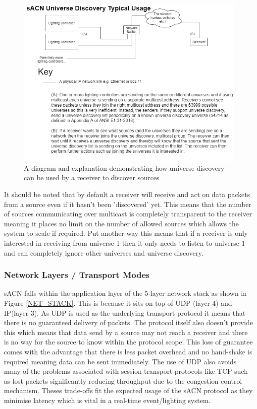 \documentclass[11pt,a4paper]{article}
\begin{document}
\begin{figure}[H]
	\includegraphics[width=\textwidth]{CS4099-Discovery-Explaination}
	\caption{A diagram and explanation demonstrating how universe discovery can be used by a receiver to discover sources}
	\label{UNI_DISCOVERY_DESC}
\end{figure}

It should be noted that by default a receiver will receive and act on data packets from a source even if it hasn't been 'discovered' yet. This means that the number of sources communicating over multicast is completely transparent to the receiver meaning it places no limit on the number of allowed sources which allows the system to scale if required. Put another way this means that if a receiver is only interested in receiving from universe 1 then it only needs to listen to universe 1 and can completely ignore other universes and universe discovery.

\subsubsection{Network Layers / Transport Modes}
sACN falls within the application layer of the 5-layer network stack as shown in Figure \ref{NET_STACK}. This is because it sits on top of UDP (layer 4) and IP(layer 3). As UDP is used as the underlying transport protocol it means that there is no guaranteed delivery of packets. The protocol itself also doesn't provide this which means that data send by a source may not reach a receiver and there is no way for the source to know within the protocol scope. This loss of guarantee comes with the advantage that there is less packet overhead and no hand-shake is required meaning data can be sent immediately. The use of UDP also avoids many of the problems associated with session transport protocols like TCP such as lost packets significantly reducing throughput due to the congestion control mechanism. Theses trade-offs fit the expected usage of the sACN protocol as they minimise latency which is vital in a real-time event/lighting system. \\
\end{document}
